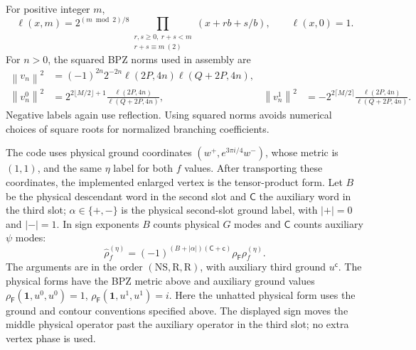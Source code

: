 \documentclass[11pt]{article}
\newcommand{\NS}{\mathrm{NS}}
\newcommand{\R}{\mathrm{R}}
\newcommand{\norm}[1]{\left\|#1\right\|^2}
\numberwithin{equation}{section}
\begin{document}
For positive integer $m$,
\begin{equation}
 \ell(x,m)=2^{(m\bmod2)/8}
 \prod_{\substack{r,s\ge0,\ r+s<m\\r+s\equiv m\ (2)}}(x+rb+s/b),
 \qquad \ell(x,0)=1.
\end{equation}
For $n>0$, the squared BPZ norms used in assembly are
\begin{align}
 \norm{v_n}&=(-1)^{2n}2^{-2n}\ell(2P,4n)\ell(Q+2P,4n),\\
 \norm{v_n^0}&=2^{2\lfloor M/2\rfloor+1}
                 \frac{\ell(2P,4n)}{\ell(Q+2P,4n)},&
 \norm{v_n^1}&=-2^{2\lceil M/2\rceil}
                 \frac{\ell(2P,4n)}{\ell(Q+2P,4n)}.
 \label{eq:norms}
\end{align}
Negative labels again use reflection. Using squared norms avoids numerical
choices of square roots for normalized branching coefficients.

The code uses physical ground coordinates
$(w^+,e^{3\pi i/4}w^-)$, whose metric is $(1,1)$, and the same
$\eta$ label for both $f$ values.
After transporting these coordinates, the implemented enlarged vertex is
the tensor-product form. Let $B$ be the physical descendant word in the
second slot and $\mathsf C$ the auxiliary word in the third slot;
$\alpha\in\{+,-\}$ is the physical second-slot ground label,
with $|+|=0$ and $|-|=1$. In sign exponents $B$ counts physical $G$
modes and $\mathsf C$ counts auxiliary $\psi$ modes:
\begin{equation}
 \hat\rho_f^{(\eta)}=
 (-1)^{(B+|\alpha|)(\mathsf C+\mathsf c)}
 \rho_{\mathsf F}\rho_f^{(\eta)}.
 \label{eq:vertex-frame}
\end{equation}
The arguments are in the order $(\NS,\R,\R)$, with auxiliary third ground
$u^{\mathsf c}$. The physical forms have the BPZ metric above and auxiliary
ground values $\rho_{\mathsf F}(\mathbf1,u^0,u^0)=1$,
$\rho_{\mathsf F}(\mathbf1,u^1,u^1)=i$.
Here the unhatted physical form uses the ground and contour conventions
specified above. The displayed sign moves the middle physical operator
past the auxiliary operator in the third slot; no extra vertex phase is used.
\end{document}
